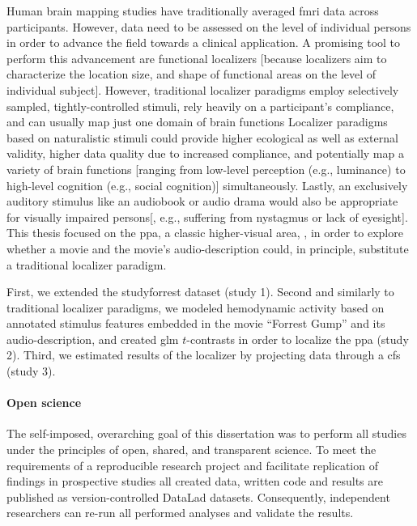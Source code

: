 
Human brain mapping studies have traditionally averaged \ac{fmri} data across
participants.
%
However, data need to be assessed on the level of individual persons in order to
advance the field towards a clinical application.
A promising tool to perform this advancement are functional localizers [because
localizers aim to characterize the location size, and shape of functional areas
on the level of individual subject].
However, traditional localizer paradigms employ selectively sampled,
tightly-controlled stimuli, rely heavily on a participant's compliance, and can
usually map just one domain of brain functions
Localizer paradigms based on naturalistic stimuli could provide higher
ecological as well as external validity, higher data quality due to increased
compliance, and potentially map a variety of brain functions [ranging from
low-level perception (e.g., luminance) to high-level cognition (e.g., social
cognition)] simultaneously.
Lastly, an exclusively auditory stimulus like an audiobook or audio drama would
also be appropriate for visually impaired persons[, e.g., suffering from
nystagmus or lack of eyesight].
This thesis focused on the \ac{ppa}, a classic higher-visual area,
\citep{epstein1998ppa}, in order to explore whether a movie and the movie's
audio-description could, in principle, substitute a traditional localizer
paradigm.


%
First, we extended the studyforrest dataset (study 1).
%
Second and similarly to traditional localizer paradigms, we modeled hemodynamic
activity based on annotated stimulus features embedded in the movie ``Forrest
Gump'' and its audio-description, and created \ac{glm} $t$-contrasts in order to
localize the \ac{ppa} (study 2).
%
Third, we estimated results of the localizer by projecting data through a
\ac{cfs} (study 3).


\paragraph{Open science}

The self-imposed, overarching goal of this dissertation was to perform all
studies under the principles of open, shared, and transparent science.
To meet the requirements of a reproducible research project and facilitate
replication of findings in prospective studies all created data, written code
and results are published as version-controlled DataLad
\citep[\href{www.datalad.org}{datalad.org};][]{halchenko2021datalad} datasets.
Consequently, independent researchers can re-run all performed analyses and
validate the results.


